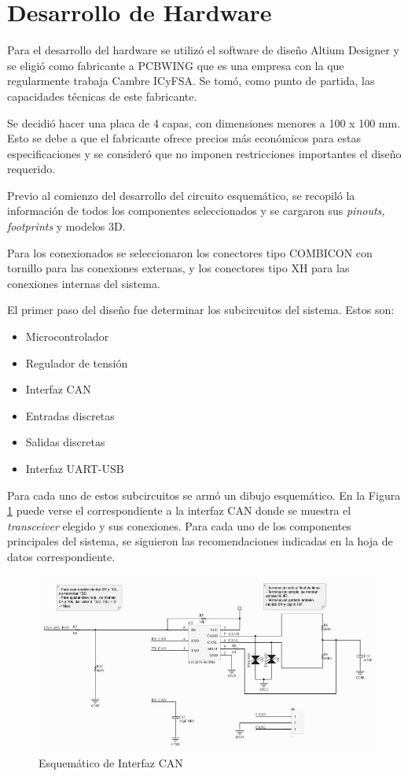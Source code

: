 \section{Desarrollo de Hardware}
\label{desarrollo_hw}

Para el desarrollo del hardware se utilizó el software de diseño Altium Designer\citep{web_altium} y se eligió como fabricante a PCBWING\citep{web_pcbwing} que es una empresa con la que regularmente trabaja Cambre ICyFSA. Se tomó, como punto de partida, las capacidades técnicas de este fabricante.

Se decidió hacer una placa de 4 capas, con dimensiones menores a 100 x 100 mm. Esto se debe a que el fabricante ofrece precios más económicos para estas especificaciones y se consideró que no imponen restricciones importantes el diseño requerido.

Previo al comienzo del desarrollo del circuito esquemático, se recopiló la información de todos los componentes seleccionados y se cargaron sus \textit{pinouts, footprints} y modelos 3D. 

Para los conexionados se seleccionaron los conectores tipo COMBICON con tornillo\citep{web_combicon} para las conexiones externas, y los conectores tipo XH\citep{web_xh_connector} para las conexiones internas del sistema.

El primer paso del diseño fue determinar los subcircuitos del sistema. Estos son:
\begin{itemize}
	\item Microcontrolador
	\item Regulador de tensión	
	\item Interfaz CAN
	\item Entradas discretas
	\item Salidas discretas
	\item Interfaz UART-USB
\end{itemize}

Para cada uno de estos subcircuitos se armó un dibujo esquemático. En la Figura \ref{fig:esquematico_can} puede verse el correspondiente a la interfaz CAN donde se muestra el \textit{transceiver} elegido y sus conexiones. Para cada uno de los componentes principales del sistema, se siguieron las recomendaciones indicadas en la hoja de datos correspondiente. 

\begin{figure}[htbp]
	\centering
	\includegraphics[scale=.6]{./Figures/sch_can.JPG}
	\caption{Esquemático de Interfaz CAN}
	\label{fig:esquematico_can}
\end{figure}

